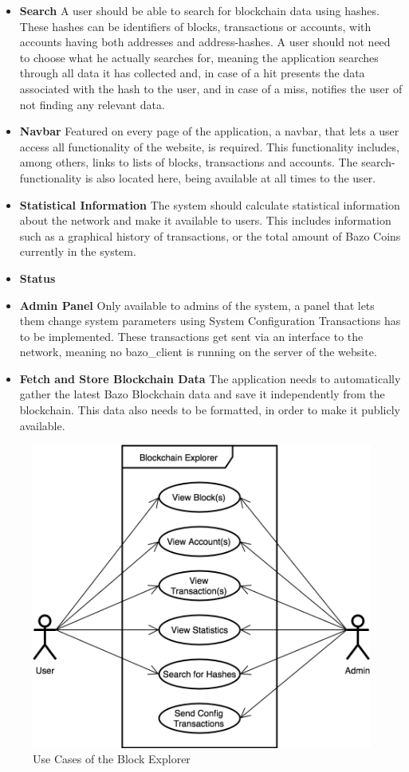 \begin{itemize}
\item \textbf{Search}
A user should be able to search for blockchain data using hashes. These hashes can be identifiers of blocks, transactions or accounts, with accounts having both addresses and address-hashes. A user should not need to choose what he actually searches for, meaning the application searches through all data it has collected and, in case of a hit presents the data associated with the hash to the user, and in case of a miss, notifies the user of not finding any relevant data.
\item \textbf{Navbar}
Featured on every page of the application, a navbar, that lets a user access all functionality of the website, is required. This functionality includes, among others, links to lists of blocks, transactions and accounts. The search-functionality is also located here, being available at all times to the user.
\item \textbf{Statistical Information}
The system should calculate statistical information about the network and make it available to users. This includes information such as a graphical history of transactions, or the total amount of Bazo Coins currently in the system.
\item \textbf{Status}
\item \textbf{Admin Panel}
Only available to admins of the system, a panel that lets them change system parameters using System Configuration Transactions has to be implemented. These transactions get sent via an interface to the network, meaning no bazo{\_}client is running on the server of the website.
\item \textbf{Fetch and Store Blockchain Data}
The application needs to automatically gather the latest Bazo Blockchain data and save it independently from the blockchain. This data also needs to be formatted, in order to make it publicly available. 
\end{itemize}

\begin{figure}
  \includegraphics[width=\linewidth]{usecase1.png}
  \caption{Use Cases of the Block Explorer}
  \label{fig:usecase1}
\end{figure}

